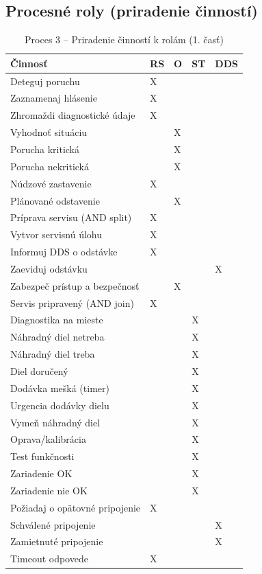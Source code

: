\documentclass[12pt,a4paper]{article}
\begin{document}
\subsection{Procesné roly (priradenie činností)}
\begin{table}[H]
  \centering
  \small
  \renewcommand{\arraystretch}{1.2}
  \begin{tabularx}{\textwidth}{|X|p{}|p{}|p{}|p{}|}
    \hline
    \textbf{Činnosť} & \textbf{RS} & \textbf{O} & \textbf{ST} & \textbf{DDS} \\
    \hline
    Deteguj poruchu & X & & & \\
    \hline
    Zaznamenaj hlásenie & X & & & \\
    \hline
    Zhromaždi diagnostické údaje & X & & & \\
    \hline
    Vyhodnoť situáciu & & X & & \\
    \hline
    Porucha kritická & & X & & \\
    \hline
    Porucha nekritická & & X & & \\
    \hline
    Núdzové zastavenie & X & & & \\
    \hline
    Plánované odstavenie & & X & & \\
    \hline
    Príprava servisu (AND split) & X & & & \\
    \hline
    Vytvor servisnú úlohu & X & & & \\
    \hline
    Informuj DDS o odstávke & X & & & \\
    \hline
    Zaeviduj odstávku & & & & X \\
    \hline
    Zabezpeč prístup a bezpečnosť & & X & & \\
    \hline
    Servis pripravený (AND join) & X & & & \\
    \hline
    Diagnostika na mieste & & & X & \\
    \hline
    Náhradný diel netreba & & & X & \\
    \hline
    Náhradný diel treba & & & X & \\
    \hline
    Diel doručený & & & X & \\
    \hline
    Dodávka mešká (timer) & & & X & \\
    \hline
    Urgencia dodávky dielu & & & X & \\
    \hline
    Vymeň náhradný diel & & & X & \\
    \hline
    Oprava/kalibrácia & & & X & \\
    \hline
    Test funkčnosti & & & X & \\
    \hline
    Zariadenie OK & & & X & \\
    \hline
    Zariadenie nie OK & & & X & \\
    \hline
    Požiadaj o opätovné pripojenie & X & & & \\
    \hline
    Schválené pripojenie & & & & X \\
    \hline
    Zamietnuté pripojenie & & & & X \\
    \hline
    Timeout odpovede & X & & & \\
    \hline
  \end{tabularx}
  \caption{Proces 3 -- Priradenie činností k rolám (1. časť)}
\end{table}
\end{document}
